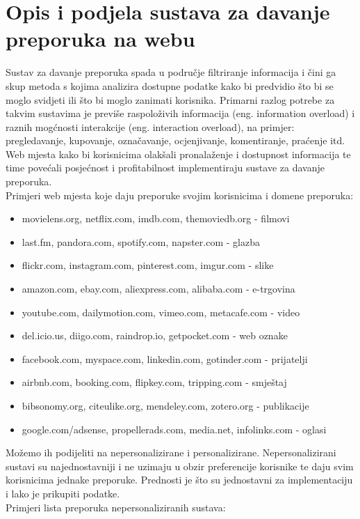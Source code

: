\documentclass[a4paper,oneside,12pt]{memoir} %
\begin{document}
\chapter{Opis i podjela sustava za davanje preporuka na webu}	
Sustav za davanje preporuka spada u područje filtriranje informacija i čini ga skup metoda s kojima analizira dostupne podatke kako bi predvidio što bi se moglo svidjeti ili što bi moglo zanimati korisnika. Primarni razlog potrebe za takvim sustavima je previše raspoloživih informacija (eng. information overload) i raznih mogćnosti interakcije (eng. interaction overload), na primjer: pregledavanje, kupovanje, označavanje, ocjenjivanje, komentiranje, praćenje itd. Web mjesta kako bi korisnicima olakšali pronalaženje i dostupnost informacija te time povećali posjećnost i profitabilnost implementiraju sustave za davanje preporuka.
\bigskip
\\ Primjeri web mjesta koje daju preporuke svojim korisnicima i domene preporuka:
\begin{itemize}[topsep=2pt]
\setlength{\parskip}{0pt}
\item movielens.org, netflix.com, imdb.com, themoviedb.org - filmovi
\item last.fm, pandora.com, spotify.com, napster.com - glazba
\item flickr.com, instagram.com, pinterest.com, imgur.com - slike
\item amazon.com, ebay.com, aliexpress.com, alibaba.com - e-trgovina
\item youtube.com, dailymotion.com, vimeo.com, metacafe.com - video
\item del.icio.us, diigo.com, raindrop.io, getpocket.com - web oznake 
\item facebook.com, myspace.com, linkedin.com, gotinder.com - prijatelji
\item airbnb.com, booking.com, flipkey.com, tripping.com - smještaj
\item bibsonomy.org, citeulike.org, mendeley.com, zotero.org - publikacije
\item google.com/adsense, propellerads.com, media.net, infolinks.com - oglasi
\end{itemize}
\bigskip
\par
Možemo ih podijeliti na nepersonalizirane i personalizirane. Nepersonalizirani sustavi su najednostavniji i ne uzimaju u obzir preferencije korisnike te daju svim korisnicima jednake preporuke. Prednosti je što su jednostavni za implementaciju i lako je prikupiti podatke.
\bigskip
\\ Primjeri lista preporuka nepersonaliziranih sustava:
\end{document}

